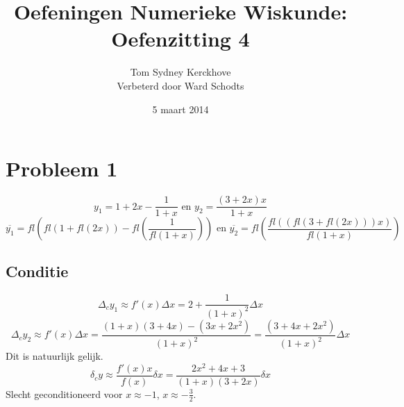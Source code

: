 \documentclass[12pt,a4paper]{article}
\author{Tom Sydney Kerckhove\\
		Verbeterd door Ward Schodts}
\title{Oefeningen Numerieke Wiskunde:\\ Oefenzitting 4}
\date{5 maart 2014}
\begin{document}
\maketitle

\section{Probleem 1}
\[
y_1 = 1+2x-\frac{1}{1+x}
 \text{ en } 
y_2 = \frac{(3+2x)x}{1+x}
\]
\[
\overline{y_1} = fl\left(fl(1+fl(2x))-fl\left(\frac{1}{fl(1+x)}\right)\right)
 \text{ en } 
\overline{y_2} = fl\left(\frac{fl((fl(3+fl(2x)))x)}{fl(1+x)}\right)
\]

\subsection{Conditie}
\[
\Delta_cy_1 \approx f'(x)\Delta x
= 2 + \frac{1}{(1+x)^2}\Delta x
\]
\[
\Delta_cy_2 \approx f'(x)\Delta x
= \frac{(1+x)(3+4x)-(3x+2x^2)}{(1+x)^2}
= \frac{(3+4x+2x^2)}{(1+x)^2}\Delta
x
\]
Dit is natuurlijk gelijk.
\[
\delta_cy \approx \frac{f'(x)x}{f(x)}\delta x
= \frac{2x^2+4x+3}{(1+x)(3+2x)}\delta x
\]
Slecht geconditioneerd voor $x\approx-1$, $x \approx -\frac{3}{2}$.
\end{document}
